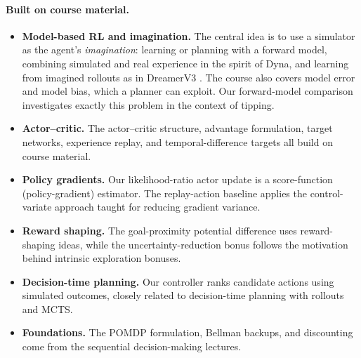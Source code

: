 \documentclass[12pt]{article}
\begin{document}
\paragraph{Built on course material.}
\begin{itemize}[leftmargin=1.4em,itemsep=3pt,topsep=3pt]
\item \textbf{Model-based RL and imagination.} The central idea is to use a simulator as the agent's \emph{imagination}: learning or planning with a forward model, combining simulated and real experience in the spirit of Dyna, and learning from imagined rollouts as in DreamerV3 \cite{dreamerv3}. The course also covers model error and model bias, which a planner can exploit. Our forward-model comparison investigates exactly this problem in the context of tipping.
\item \textbf{Actor--critic.} The actor--critic structure, advantage formulation, target networks, experience replay, and temporal-difference targets all build on course material.
\item \textbf{Policy gradients.} Our likelihood-ratio actor update is a score-function (policy-gradient) estimator. The replay-action baseline applies the control-variate approach taught for reducing gradient variance.
\item \textbf{Reward shaping.} The goal-proximity potential difference uses reward-shaping ideas, while the uncertainty-reduction bonus follows the motivation behind intrinsic exploration bonuses.
\item \textbf{Decision-time planning.} Our controller ranks candidate actions using simulated outcomes, closely related to decision-time planning with rollouts and MCTS.
\item \textbf{Foundations.} The POMDP formulation, Bellman backups, and discounting come from the sequential decision-making lectures.
\end{itemize}
\end{document}
